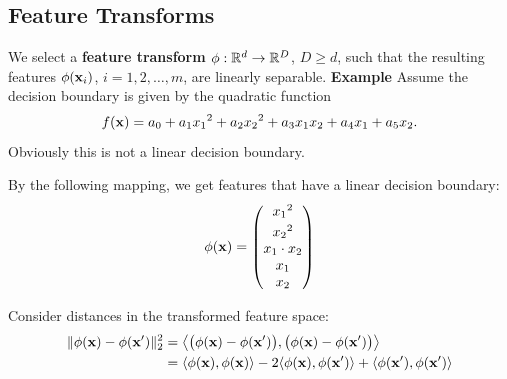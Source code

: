 \subsection{Feature Transforms}

  	We select a   \textbf{feature transform $\phi: \mathbb{R}^d \rightarrow \mathbb{R}^D$}, $D \ge d$, such that the resulting features $\phi(\bm{\mathrm{x}}_i)$, $i=1,2,\dots, m$, are linearly separable.  
	\textbf {Example}
		Assume the decision boundary is given by the quadratic function
		\begin{displaymath}
			f(\bm{\mathrm{x}}) = a_0 + a_1 {x_1}^2 + a_2 {x_2}^2 + a_3 x_1 x_2 + a_4 x_1+a_5 x_2.
		\end{displaymath}
		Obviously this is not a linear decision boundary.    

		By the following mapping, we get features that have a linear decision boundary:
		\footnotesize
		\begin{displaymath}
			\phi(\bm{\mathrm{x}}) = \left(
			\begin{matrix}
				{x_1}^2 \\[1mm] {x_2}^2 \\ x_1 \cdot x_2 \\ x_1 \\ x_2
			\end{matrix}
			\right)
		\end{displaymath}

	Consider distances in the transformed feature space: \\
	\begin{align*}
		\| \phi(\bm{\mathrm{x}})-\phi (\bm{\mathrm{x}}')\|_2^2
		&= \left\langle \big(\phi(\bm{\mathrm{x}})-\phi (\bm{\mathrm{x}}')\big), \big(\phi(\bm{\mathrm{x}})-\phi (\bm{\mathrm{x}}')\big)\right\rangle \\
		&= \langle \phi(\bm{\mathrm{x}}), \phi(\bm{\mathrm{x}})\rangle - 2 \langle \phi(\bm{\mathrm{x}}), \phi(\bm{\mathrm{x}}') \rangle + \langle \phi(\bm{\mathrm{x}}'), \phi(\bm{\mathrm{x}}') \rangle
	\end{align*}
   

